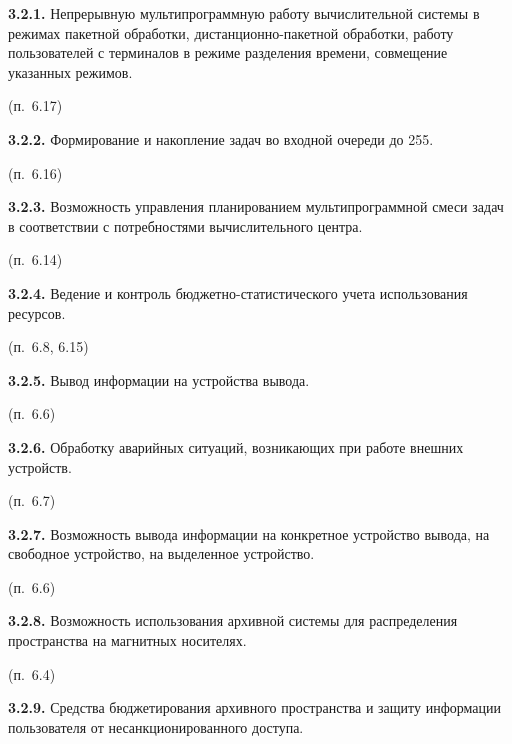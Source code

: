 \documentclass[11pt,a4paper]{article}
\begin{document}
\par\textbf{3.2.1.} Непрерывную мультипрограммную работу вычислительной системы в режимах пакетной обработки, дистанционно-пакетной обработки, работу пользователей с терминалов в режиме разделения времени, совмещение указанных режимов.\par
\begin{center}(п.~6.17)\end{center}
\par\textbf{3.2.2.} Формирование и накопление задач во входной очереди до 255.\par
\begin{center}(п.~6.16)\end{center}
\par\textbf{3.2.3.} Возможность управления планированием мультипрограммной смеси задач в соответствии с потребностями вычислительного центра.\par
\begin{center}(п.~6.14)\end{center}
\par\textbf{3.2.4.} Ведение и контроль бюджетно-статистического учета использования ресурсов.\par
\begin{center}(п.~6.8, 6.15)\end{center}
\par\textbf{3.2.5.} Вывод информации на устройства вывода.\par
\begin{center}(п.~6.6)\end{center}
\par\textbf{3.2.6.} Обработку аварийных ситуаций, возникающих при работе внешних устройств.\par
\begin{center}(п.~6.7)\end{center}
\par\textbf{3.2.7.} Возможность вывода информации на конкретное устройство вывода, на свободное устройство, на выделенное устройство.\par
\begin{center}(п.~6.6)\end{center}
\par\textbf{3.2.8.} Возможность использования архивной системы для распределения пространства на магнитных носителях.\par
\begin{center}(п.~6.4)\end{center}
\par\textbf{3.2.9.} Средства бюджетирования архивного пространства и защиту информации пользователя от несанкционированного доступа.\par
\end{document}
